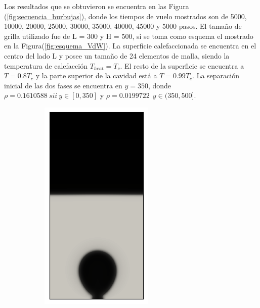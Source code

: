 Los resultados que se obtuvieron se encuentra en las Figura (\ref{fig:secuencia_burbujas}), donde los tiempos de vuelo mostrados son de 5000, 10000, 20000, 25000, 30000, 35000, 40000, 45000 y 5000 pasos. El tamaño de grilla utilizado fue de L = 300 y H = 500, si se toma como esquema el mostrado en la Figura(\ref{fig:esquema_VdW}). La superficie calefaccionada se encuentra en el centro del lado L y posee un tamaño de 24 elementos de malla, siendo la temperatura de calefacción $T_{heat} = T_c$. El resto de la superficie se encuentra a $T = 0.8 T_c$ y la parte superior de la cavidad está a $T = 0.99 T_c$. La separación inicial de las dos fases se encuentra en $y = 350$, donde $\rho = 0.1610588 \> sii \> y \in [0,350]$ y $\rho = 0.0199722 \>\> y \in (350,500]$.

\begin{figure}[h!]
	\centering
	\begin{subfigure}{0.25\textwidth}
		\includegraphics[width=\linewidth]{figs/cap4/bubble_5}

\end{subfigure}
\end{figure}
